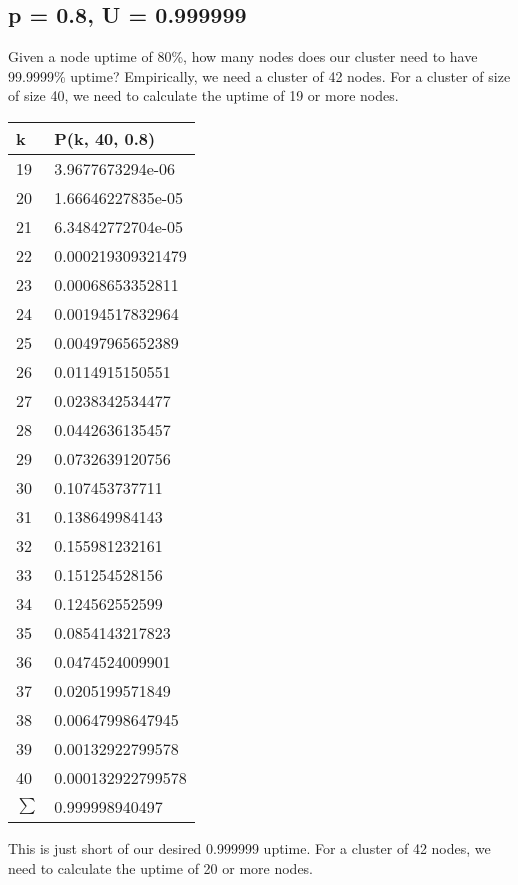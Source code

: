 \documentclass[11pt, oneside]{article}
\begin{document}
\subsection{p = 0.8, U = 0.999999}
Given a node uptime of 80\%, how many nodes does our cluster need to have
99.9999\% uptime?  Empirically, we need a cluster of 42 nodes.
\newline\newline
\noindent For a cluster of size of size 40, we need to calculate the uptime of
19 or more nodes.

\begin{center}
\begin{tabular}{| l | l |}
\hline
k & P(k, 40, 0.8) \\
\hline
19 & 3.9677673294e-06 \\
20 & 1.66646227835e-05 \\
21 & 6.34842772704e-05 \\
22 & 0.000219309321479 \\
23 & 0.00068653352811 \\
24 & 0.00194517832964 \\
25 & 0.00497965652389 \\
26 & 0.0114915150551 \\
27 & 0.0238342534477 \\
28 & 0.0442636135457 \\
29 & 0.0732639120756 \\
30 & 0.107453737711 \\
31 & 0.138649984143 \\
32 & 0.155981232161 \\
33 & 0.151254528156 \\
34 & 0.124562552599 \\
35 & 0.0854143217823 \\
36 & 0.0474524009901 \\
37 & 0.0205199571849 \\
38 & 0.00647998647945 \\
39 & 0.00132922799578 \\
40 & 0.000132922799578 \\
\hline
$\sum$ & 0.999998940497 \\
\hline
\end{tabular}
\end{center}

\noindent This is just short of our desired 0.999999 uptime. For a cluster of
42 nodes, we need to calculate the uptime of 20 or more nodes.
\end{document}
